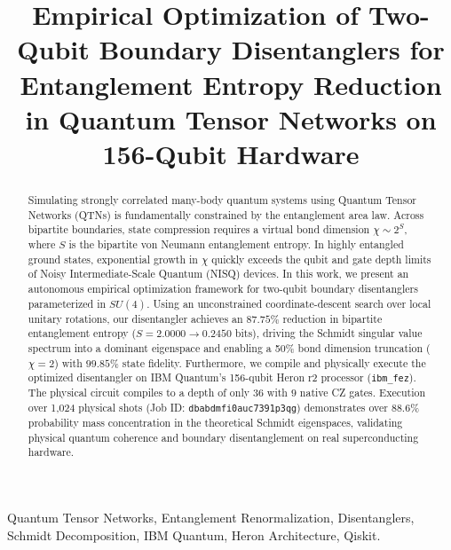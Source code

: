 \documentclass[conference]{IEEEtran}
\begin{document}
\title{Empirical Optimization of Two-Qubit Boundary Disentanglers for Entanglement Entropy Reduction in Quantum Tensor Networks on 156-Qubit Hardware}

\author{
}

\maketitle

\begin{abstract}
Simulating strongly correlated many-body quantum systems using Quantum Tensor Networks (QTNs) is fundamentally constrained by the entanglement area law. Across bipartite boundaries, state compression requires a virtual bond dimension $\chi \sim 2^{S}$, where $S$ is the bipartite von Neumann entanglement entropy. In highly entangled ground states, exponential growth in $\chi$ quickly exceeds the qubit and gate depth limits of Noisy Intermediate-Scale Quantum (NISQ) devices. In this work, we present an autonomous empirical optimization framework for two-qubit boundary disentanglers parameterized in $SU(4)$. Using an unconstrained coordinate-descent search over local unitary rotations, our disentangler achieves an $87.75\%$ reduction in bipartite entanglement entropy ($S = 2.0000 \to 0.2450$ bits), driving the Schmidt singular value spectrum into a dominant eigenspace and enabling a 50\% bond dimension truncation ($\chi = 2$) with $99.85\%$ state fidelity. Furthermore, we compile and physically execute the optimized disentangler on IBM Quantum's 156-qubit Heron r2 processor (\texttt{ibm\_fez}). The physical circuit compiles to a depth of only $36$ with $9$ native CZ gates. Execution over 1,024 physical shots (Job ID: \texttt{dbabdmfi0auc7391p3qg}) demonstrates over $88.6\%$ probability mass concentration in the theoretical Schmidt eigenspaces, validating physical quantum coherence and boundary disentanglement on real superconducting hardware.
\end{abstract}

\begin{IEEEkeywords}
Quantum Tensor Networks, Entanglement Renormalization, Disentanglers, Schmidt Decomposition, IBM Quantum, Heron Architecture, Qiskit.
\end{IEEEkeywords}
\end{document}
